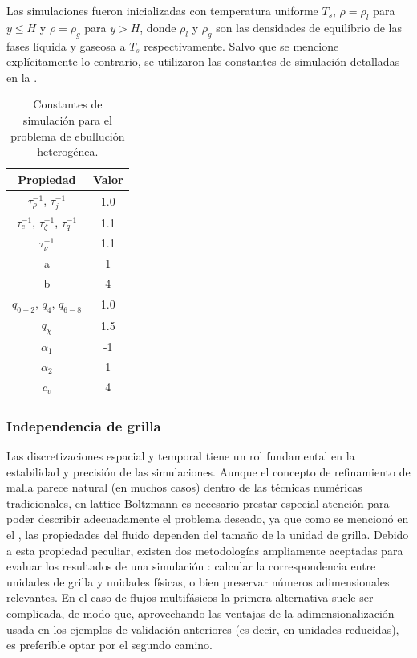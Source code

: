 Las simulaciones fueron inicializadas con temperatura uniforme $T_s$, $\rho = \rho_l$ para $y\leq H$ y $\rho = \rho_g$ para $y > H$, donde $\rho_l$ y $\rho_g$ son las densidades de equilibrio de las fases l\'iquida y gaseosa a $T_s$ respectivamente. Salvo que se mencione expl\'icitamente lo contrario, se utilizaron las constantes de simulaci\'on detalladas en la .

\begin{table}[ht]
	\centering
    \begin{tabular}{c c}
	    \toprule
        \bf Propiedad & \bf Valor \\
        \midrule
        $\tau_{\rho}^{-1}$, $\tau_{j}^{-1}$ & 1.0\\
        $\tau_{e}^{-1}$, $\tau_{\zeta}^{-1}$, $\tau_{q}^{-1}$ & 1.1 \\
        $\tau_{\nu}^{-1}$ & 1.1 \\
		a & 1 \\
		b & 4 \\
		$q_{0-2}$, $q_4$, $q_{6-8}$ & 1.0 \\
		$q_{\chi}$ & 1.5 \\
		$\alpha_1$ & -1 \\
		$\alpha_2$ & 1 \\
		$c_v$ & 4 \\
        \bottomrule
	\end{tabular}
	\caption{Constantes de simulaci\'on para el problema de ebulluci\'on heterog\'enea.}
	\label{tab:hetb_prop}
\end{table}  
\FloatBarrier


\subsubsection{Independencia de grilla}

Las discretizaciones espacial y temporal tiene un rol fundamental en la estabilidad y precisi\'on de las simulaciones. Aunque el concepto de refinamiento de malla parece natural (en muchos casos) dentro de las t\'ecnicas num\'ericas tradicionales, en lattice Boltzmann es necesario prestar especial atenci\'on para poder describir adecuadamente el problema deseado, ya que como se mencion\'o en el , las propiedades del fluido dependen del tama\~no de la unidad de grilla. Debido a esta propiedad peculiar, existen dos metodolog\'ias ampliamente aceptadas para evaluar los resultados de una simulaci\'on \cite{kruger_lattice_2017}: calcular la correspondencia entre unidades de grilla y unidades f\'isicas, o bien preservar n\'umeros adimensionales relevantes. En el caso de flujos multif\'asicos la primera alternativa suele ser complicada, de modo que, aprovechando las ventajas de la adimensionalizaci\'on usada en los ejemplos de validaci\'on anteriores (es decir, en unidades reducidas), es preferible optar por el segundo camino.

